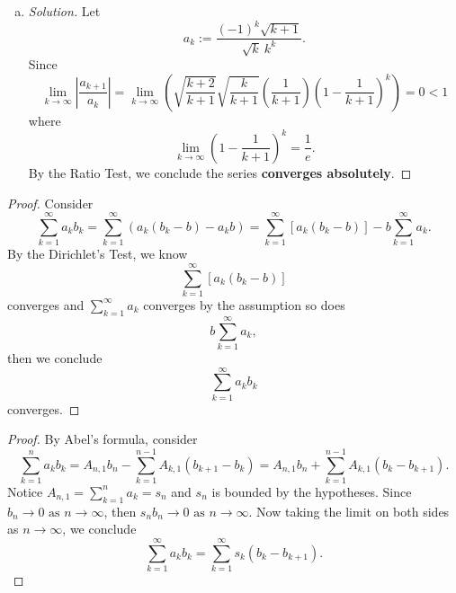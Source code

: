 \documentclass{report}
\newenvironment{solution}
  {\begin{proof}[Solution]}
  {\end{proof}}
\begin{document}
\begin{Exercise}
\begin{enumerate}[a)]
\item
\begin{solution}
Let $$a_k := \frac{(-1)^k\sqrt{k+1}}{\sqrt{k}\ k^k}.$$
Since $$\lim_{k\to\infty}\left|\frac{a_{k+1}}{a_k}\right| =
\lim_{k\to\infty}\left(\sqrt{\frac{k+2}{k+1}}\sqrt{\frac{k}{k+1}}\left(\frac{1}{k+1}\right)\left(1-\frac{1}{k+1}\right)^k\right) = 0 < 1$$
where $$\lim_{k\to\infty}\left(1-\frac{1}{k+1}\right)^k = \frac{1}{e}.$$
By the Ratio Test, we conclude the series \textbf{converges absolutely}.
\end{solution}
\end{enumerate}
\end{Exercise}

\vspace{12pt}
\begin{Exercise}
\begin{proof}
Consider $$\sum_{k=1}^{\infty}a_k b_k =
\sum_{k=1}^{\infty}\left( a_k(b_k-b) - a_k b\right) = 
\sum_{k=1}^{\infty}\left[ a_k(b_k-b) \right] - b\sum_{k=1}^{\infty}a_k.$$
By the Dirichlet's Test, we know $$\sum_{k=1}^{\infty}\left[ a_k(b_k-b) \right]$$ converges and $\sum_{k=1}^{\infty}a_k$ converges by the assumption so does $$b\sum_{k=1}^{\infty}a_k,$$ then we conclude $$\sum_{k=1}^{\infty}a_k b_k$$ converges.
\end{proof}
\end{Exercise}

\vspace{12pt}
\begin{Exercise}
\begin{proof}
By Abel's formula, consider $$\sum_{k=1}^{n}a_k b_k = 
A_{n,1}b_n - \sum_{k=1}^{n-1}A_{k,1}(b_{k+1}-b_k) = A_{n,1}b_n + \sum_{k=1}^{n-1}A_{k,1}(b_k-b_{k+1}).$$ Notice $A_{n,1} = \sum_{k=1}^{n}a_k = s_n$ and $s_n$ is bounded by the hypotheses. Since $b_n\to 0\text{ as } n\to\infty$, then $s_n b_n\to 0\text{ as } n\to\infty$. Now taking the limit on both sides as $n\to\infty$, we conclude  $$\sum_{k=1}^{\infty}a_k b_k = \sum_{k=1}^{\infty}s_k (b_k - b_{k+1}).$$
\end{proof}
\end{Exercise}
\end{document}
